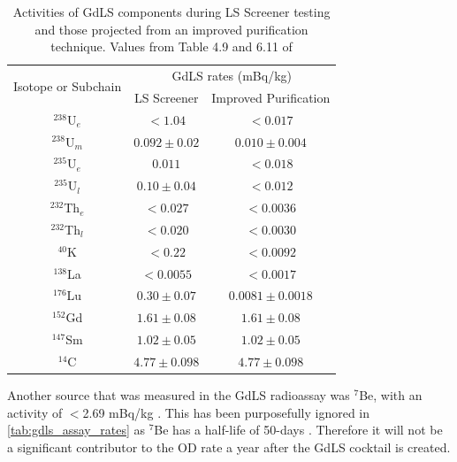 \begin{table}[]
    \centering
    \begin{tabular}{c|c|c}
        \multirow{2}{*}{Isotope or Subchain}  &  \multicolumn{2}{c}{GdLS rates (mBq/kg)}      \\ 
                             &  LS Screener          & Improved Purification \\ \hline
        ${}^{238}$U$_{e}$      &  $< 1.04$             & $< 0.017$             \\ 
        ${}^{238}$U$_{m}$      &  $0.092\pm0.02$       & $0.010\pm0.004$       \\
        ${}^{235}$U$_{e}$      &  $0.011$              & $< 0.018$             \\
        ${}^{235}$U$_{l}$      &  $0.10\pm0.04$        & $< 0.012$             \\
        ${}^{232}$Th$_{e}$     &  $< 0.027$            & $< 0.0036$            \\
        ${}^{232}$Th$_{l}$     &  $< 0.020$            & $< 0.0030$            \\
        ${}^{40}$K           &  $< 0.22$             & $< 0.0092$            \\
        ${}^{138}$La         &  $< 0.0055$           & $< 0.0017$            \\
        ${}^{176}$Lu         &  $0.30\pm0.07$        & $0.0081\pm0.0018$     \\
        ${}^{152}$Gd       &  $1.61\pm0.08$        & $1.61\pm0.08$         \\
        ${}^{147}$Sm       &  $1.02\pm0.05$        & $1.02\pm0.05$         \\
        ${}^{14}$C         &  $4.77\pm0.098$       & $4.77\pm0.098$ 
    \end{tabular}
    \caption{Activities of GdLS components during LS Screener testing and those projected from an improved purification technique. Values from Table 4.9 and 6.11 of \cite{scotthaselschwardt_thesis_ref}}
    \label{tab:gdls_assay_rates}
\end{table}
\par
Another source that was measured in the GdLS radioassay was ${}^{7}$Be, with an activity of $<$2.69 mBq/kg \cite{scotthaselschwardt_thesis_ref}.
This has been purposefully ignored in \autoref{tab:gdls_assay_rates} as ${}^{7}$Be has a half-life of 50-days \cite{be7_decay_ref}.
Therefore it will not be a significant contributor to the OD rate a year after the GdLS cocktail is created.

